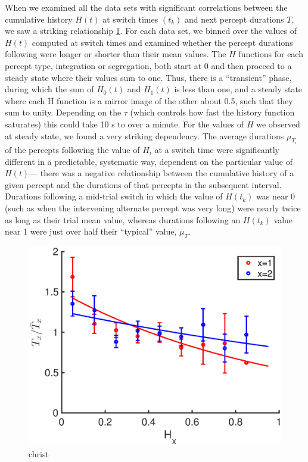 When we examined all the data sets with significant correlations between the cumulative history $H(t)$ at switch times $(t_k)$ and next percept durations $T$, we saw a striking relationship \ref{fig:T_vs_H}. For each data set, we binned over the values of $H(t)$ computed at switch times and examined whether the percept durations following were longer or shorter than their mean values. The $H$ functions for each percept type, integration or segregation, both start at 0 and then proceed to a steady state where their values sum to one. Thus, there is a “transient” phase, during which the sum of $H_0(t)$ and $H_1(t)$ is less than one, and a steady state where each H function is a mirror image of the other about 0.5, such that they sum to unity. Depending on the $\tau$ (which controls how fast the history function saturates) this could take 10 s to over a  minute. For the values of $H$ we observed at steady state, we found a very striking dependency. The average durations $\mu_{T_i}$ of the percepts following the value of $H_i$ at a switch time were significantly different in a predictable, systematic way, dependent on the particular value of $H(t)$--- there was a negative relationship between the cumulative history of a given percept and the durations of that percepts in the subsequent interval. Durations following a mid-trial switch in which the value of $H(t_k)$ was near 0 (such as when the intervening alternate percept was very long) were nearly twice as long as their trial mean value, whereas durations following an $H(t_k)$ value near 1 were just over half their “typical” value, $\mu_{T}$.

\begin{figure}
	\centering
	\includegraphics[scale=0.7]{ch3Figs/tbyh.eps}
	\caption{christ}
	\label{fig:T_vs_H}
\end{figure}

